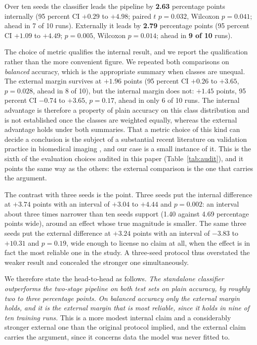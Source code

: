 \documentclass{melba}
\begin{document}
Over ten seeds the classifier leads the pipeline by \textbf{2.63} percentage points internally (95 percent CI $+0.29$ to $+4.98$; paired $t$ $p=0.032$, Wilcoxon $p=0.041$; ahead in 7 of 10 runs). Externally it leads by \textbf{2.79} percentage points (95 percent CI $+1.09$ to $+4.49$; $p=0.005$, Wilcoxon $p=0.014$; ahead in \textbf{9 of 10} runs).

The choice of metric qualifies the internal result, and we report the qualification rather than the more convenient figure. We repeated both comparisons on \emph{balanced} accuracy, which is the appropriate summary when classes are unequal. The external margin survives at $+1.96$ points (95 percent CI $+0.26$ to $+3.65$, $p=0.028$, ahead in 8 of 10), but the internal margin does not: $+1.45$ points, 95 percent CI $-0.74$ to $+3.65$, $p=0.17$, ahead in only 6 of 10 runs. The internal advantage is therefore a property of plain accuracy on this class distribution and is not established once the classes are weighted equally, whereas the external advantage holds under both summaries. That a metric choice of this kind can decide a conclusion is the subject of a substantial recent literature on validation practice in biomedical imaging \citep{metricsreloaded}, and our case is a small instance of it. This is the sixth of the evaluation choices audited in this paper (Table~\ref{tab:audit}), and it points the same way as the others: the external comparison is the one that carries the argument.

The contrast with three seeds is the point. Three seeds put the internal difference at $+3.74$ points with an interval of $+3.04$ to $+4.44$ and $p=0.002$: an interval about three times narrower than ten seeds support (1.40 against 4.69 percentage points wide), around an effect whose true magnitude is smaller. The same three seeds put the external difference at $+3.24$ points with an interval of $-3.83$ to $+10.31$ and $p=0.19$, wide enough to license no claim at all, when the effect is in fact the most reliable one in the study. A three-seed protocol thus overstated the weaker result and concealed the stronger one simultaneously.

We therefore state the head-to-head as follows. \emph{The standalone classifier outperforms the two-stage pipeline on both test sets on plain accuracy, by roughly two to three percentage points. On balanced accuracy only the external margin holds, and it is the external margin that is most reliable, since it holds in nine of ten training runs.} This is a more modest internal claim and a considerably stronger external one than the original protocol implied, and the external claim carries the argument, since it concerns data the model was never fitted to.
\end{document}
